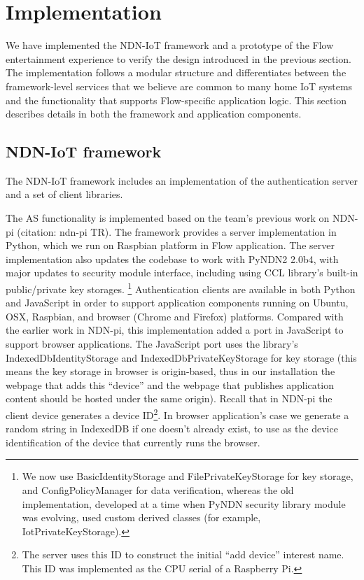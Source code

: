 \section{Implementation}
\label{sec:implementation}

We have implemented the NDN-IoT framework and a prototype of the Flow entertainment experience to verify the design introduced in the previous section.
The implementation follows a modular structure and differentiates between the framework-level services that we believe are common to many home IoT systems and the functionality that supports Flow-specific application logic.
This section describes details in both the framework and application components.

\subsection{NDN-IoT framework}

The NDN-IoT framework includes an implementation of the authentication server and a set of client libraries.

The AS functionality is implemented based on the team's previous work on NDN-pi (citation: ndn-pi TR).
The framework provides a server implementation in Python, which we run on Raspbian platform in Flow application.
The server implementation also updates the codebase to work with PyNDN2 2.0b4, with major updates to security module interface, including using CCL library's built-in public/private key storages. \footnote{We now use BasicIdentityStorage and FilePrivateKeyStorage for key storage, and ConfigPolicyManager for data verification, whereas the old implementation, developed at a time when PyNDN security library module was evolving, used custom derived classes (for example, IotPrivateKeyStorage).}
Authentication clients are available in both Python and JavaScript in order to support application components running on Ubuntu, OSX, Raspbian, and browser (Chrome and Firefox) platforms.
Compared with the earlier work in NDN-pi, this implementation added a port in JavaScript to support browser applications. 
The JavaScript port uses the library's IndexedDbIdentityStorage and IndexedDbPrivateKeyStorage for key storage (this means the key storage in browser is origin-based, thus in our installation the webpage that adds this ``device'' and the webpage that publishes application content should be hosted under the same origin). 
Recall that in NDN-pi the client device generates a device ID\footnote{The server uses this ID to construct the initial ``add device'' interest name. This ID was implemented as the CPU serial of a Raspberry Pi.}. 
In browser application's case we generate a random string in IndexedDB if one doesn't already exist, to use as the device identification of the device that currently runs the browser.

